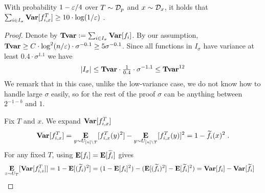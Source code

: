 \begin{theorem}\label{thm:main high var}
	With probability $1-\varepsilon/4$ over $T\sim {\mathcal{D}}_p$ and $x\sim {\mathcal{D}_x}$, it holds that  $\sum_{i\in I_{\sigma}}{\mathop{\bf Var\/}[f^T_{i,x}]} \ge 10 \cdot \log(1/\varepsilon)$ .
\end{theorem}

\begin{proof}
Denote by $\mathbf{{Tvar}} := \sum_{i\in I_{\sigma}}{\mathop{\bf Var\/}}[f_i]$.
By our assumption, $\mathbf{{Tvar}} \ge C \cdot \log^2(n/\varepsilon) \cdot \sigma^{-0.1} \ge 5 \sigma^{-0.1}$.
Since all functions in $I_{\sigma}$ have variance at least $0.4 \cdot \sigma^{1.1}$ we have 
\begin{equation}\label{eq:Tvar vs m}
|I_{\sigma}| \le  \mathbf{{Tvar}} \cdot \tfrac{1}{0.4} \cdot \sigma^{-1.1} \le \mathbf{{Tvar}}^{12}
\end{equation}
We remark that in this case, unlike the low-variance case, we do not know how to handle large $\sigma$ easily, so for the rest of the proof $\sigma$ can be anything between $2^{-1-b}$ and $1$.

Fix $T$ and $x$. We expand ${\mathop{\bf Var\/}}[f^T_{i,x}]$ 
$$
{\mathop{\bf Var\/}}[f^T_{i,x}] = \mathop{\bf E\/}_{y\sim U_{[n]\setminus T}}[f^T_{i,x}(y)^2] - \mathop{\bf E\/}_{y\sim U_{[n]\setminus T}}[f^T_{i,x}(y)]^2 = 1-\widetilde{f_i}(x)^2 \;.
$$
For any fixed $T$, using $\mathop{\bf E\/}[f_i] =\mathop{\bf E\/}[\widetilde{f_i}]$ gives
\begin{align*}
	\mathop{\bf E\/}_{z\sim U_T} [{\mathop{\bf Var\/}}[f^T_{i,z}]]   
&= 1- \mathop{\bf E\/}[(\widetilde{f_i})^2] 
= (1-\mathop{\bf E\/}[f_i]^2) - (\mathop{\bf E\/}[(\widetilde{f_i})^2] - \mathop{\bf E\/}[\widetilde{f_i}]^2)
= {\mathop{\bf Var\/}}[f_i] - {\mathop{\bf Var\/}}[\widetilde{f_i}]
\end{align*}


\end{proof}
